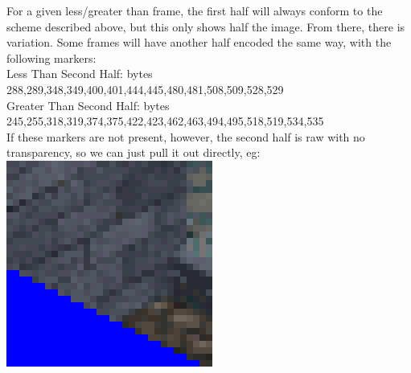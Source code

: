 \documentclass[a4paper]{article}
\begin{document}
\begin{itemize}
	For a given less/greater than frame, the first half will always conform to the scheme described above, but this only shows half the image.
	From there, there is variation. Some frames will have another half encoded the same way, with the following markers:\\
	Less Than Second Half: bytes 288,289,348,349,400,401,444,445,480,481,508,509,528,529\\
	Greater Than Second Half: bytes 245,255,318,319,374,375,422,423,462,463,494,495,518,519,534,535\\
	
	If these markers are not present, however, the second half is raw with no transparency, so we can just pull it out directly, eg:\\
	\includegraphics[scale=0.5]{rawtop}
\end{itemize}
   
\newpage



\end{document}

